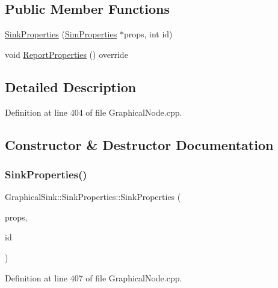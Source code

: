 \subsection*{Public Member Functions}
\begin{DoxyCompactItemize}
\item 
\hyperlink{class_graphical_sink_1_1_sink_properties_a7cfc9ddb12c953e1bd48895d0c557ae5}{Sink\+Properties} (\hyperlink{class_graphical_node_1_1_sim_properties}{Sim\+Properties} $\ast$props, int id)
\item 
void \hyperlink{class_graphical_sink_1_1_sink_properties_a382b537cdfe64ca999284f9a012aa1ab}{Report\+Properties} () override
\end{DoxyCompactItemize}


\subsection{Detailed Description}


Definition at line 404 of file Graphical\+Node.\+cpp.



\subsection{Constructor \& Destructor Documentation}
\mbox{\label{class_graphical_sink_1_1_sink_properties_a7cfc9ddb12c953e1bd48895d0c557ae5}} 
\subsubsection{\texorpdfstring{Sink\+Properties()}{SinkProperties()}}
{\footnotesize\ttfamily Graphical\+Sink\+::\+Sink\+Properties\+::\+Sink\+Properties (\begin{DoxyParamCaption}\item[{\hyperlink{class_graphical_node_1_1_sim_properties}{Sim\+Properties} $\ast$}]{props,  }\item[{int}]{id }\end{DoxyParamCaption})\hspace{0.3cm}{\ttfamily [inline]}}



Definition at line 407 of file Graphical\+Node.\+cpp.



